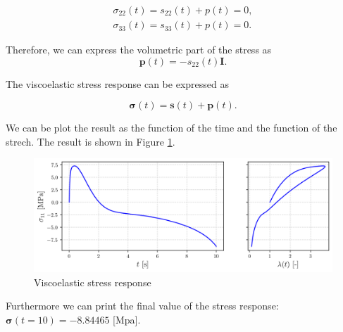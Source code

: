 \documentclass[12pt,a4paper]{article}
\begin{document}
\begin{equation}
    \begin{matrix}
        \sigma_{22}(t) = s_{22}(t) + p(t) = 0, \\
        \sigma_{33}(t) = s_{33}(t) + p(t) = 0.
    \end{matrix}
\end{equation}

Therefore, we can express the volumetric part of the stress as
\begin{equation}
    \boldsymbol{p}(t) = - s_{22}(t)\boldsymbol{I}.
\end{equation}

The viscoelastic stress response can be expressed as

\begin{equation}
    \boldsymbol{\sigma}(t) = \boldsymbol{s}(t) + \boldsymbol{p}(t).
\end{equation}

We can be plot the result as the function of the time and the function of the strech. The result is shown in Figure \ref{fig:stress}.

\begin{figure}[H]
    \centering
    \includegraphics[scale=0.8]{figures/stress.png}
    \caption{Viscoelastic stress response}
    \label{fig:stress}
\end{figure}

Furthermore we can print the final value of the stress response: $\boldsymbol{\sigma}(t=10) = -8.84465$ [Mpa].

\newpage
\end{document}
